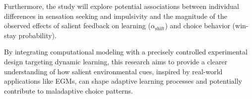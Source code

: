 Furthermore, the study will explore potential associations between individual differences in sensation seeking and impulsivity and the magnitude of the observed effects of salient feedback on learning ($\alpha_{\text{shift}}$) and choice behavior (win-stay probability).

By integrating computational modeling with a precisely controlled experimental design targeting dynamic learning, this research aims to provide a clearer understanding of how salient environmental cues, inspired by real-world applications like EGMs, can shape adaptive learning processes and potentially contribute to maladaptive choice patterns. 